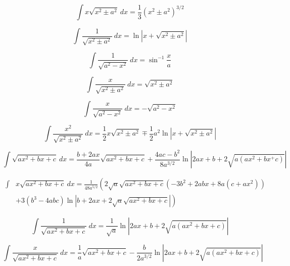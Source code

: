 \documentclass[12pt,letterpaper,leqno]{article}
\begin{document}
\begin{equation}
\int  x \sqrt{x^2 \pm a^2}\ dx= \frac{1}{3}\left ( x^2 \pm a^2 \right)^{3/2} 
\end{equation}

\begin{equation}
\int \frac{1}{\sqrt{x^2 \pm a^2}}\ dx = \ln \left | x + \sqrt{x^2 \pm a^2} \right | 
\end{equation}

\begin{equation}
\int \frac{1}{\sqrt{a^2 - x^2}}\ dx = \sin^{-1}\frac{x}{a} 
\end{equation}

\begin{equation}
\int \frac{x}{\sqrt{x^2\pm a^2}}\ dx = \sqrt{x^2 \pm a^2} 
\end{equation}

\begin{equation}
\int \frac{x}{\sqrt{a^2-x^2}}\ dx = -\sqrt{a^2-x^2} 
\end{equation}

\begin{equation}\label{eq:Russ}
\int \frac{x^2}{\sqrt{x^2 \pm a^2}}\ dx = \frac{1}{2}x\sqrt{x^2 \pm a^2}
\mp \frac{1}{2}a^2 \ln \left| x + \sqrt{x^2\pm a^2} \right | 
\end{equation}

\begin{equation}\label{eq:Winokur1}
\int \sqrt{a x^2 + b x + c}\ dx = 
\frac{b+2ax}{4a}\sqrt{ax^2+bx+c}
+
\frac{4ac-b^2}{8a^{3/2}}\ln \left| 2ax + b + 2\sqrt{a(ax^2+bx^+c)}\right |
\end{equation}

\begin{equation}\label{eq:Larry-Morris}\begin{split}
\int &x \sqrt{a x^2 + bx + c}\ dx = \frac{1}{48a^{5/2}}\left ( 
2 \sqrt{a} \sqrt{ax^2+bx+c}
\right .  
  \left( - 3b^2 + 2 abx + 8 a(c+ax^2) \right)
\\ &  \left.
 + 3(b^3-4abc)\ln \left|b + 2ax + 2\sqrt{a}\sqrt{ax^2+bx+c} \right| \right)
 \end{split}
\end{equation}

\begin{equation}
\int\frac{1}{\sqrt{ax^2+bx+c}}\ dx=
\frac{1}{\sqrt{a}}\ln \left| 2ax+b + 2 \sqrt{a(ax^2+bx+c)} \right | 
\end{equation}

\begin{equation}\label{eq:Duley}
\int \frac{x}{\sqrt{ax^2+bx+c}}\ dx=
\frac{1}{a}\sqrt{ax^2+bx + c} 
-
\frac{b}{2a^{3/2}}\ln \left| 2ax+b + 2 \sqrt{a(ax^2+bx+c)} \right |
\end{equation}
\end{document}
